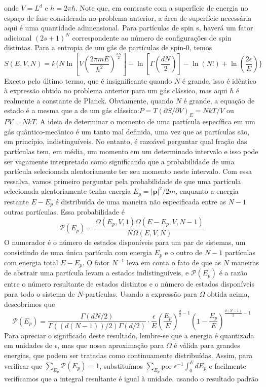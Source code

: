 \documentclass[12pt]{article}
\begin{document}
onde $V = L^d$ e $h = 2\pi\hbar$. Note que, em contraste com a superfície de energia no espaço de fase considerada no problema anterior, a área de superfície necessária aqui é uma quantidade adimensional. Para partículas de spin s, haverá um fator adicional $(2s + 1)^N$ correspondente ao número de configurações de spin distintas.
Para a entropia de um gás de partículas de spin-0, temos
\[
S(E, V, N) = k \biggl \{  N \ln \left[ V \left( \frac{2 \pi m E}{h^2} \right)^{\frac{dN}{2}} \right] - \ln \left[ \Gamma \left( \frac{dN}{2} \right) \right] - \ln(N!) + \ln \left( \frac{2 \epsilon}{E} \right)  \biggl \}
\]
Exceto pelo último termo, que é insignificante quando $N$ é grande, isso é idêntico à expressão obtida no problema anterior para um gás clássico, mas aqui $h$ é realmente a constante de Planck. Obviamente, quando $N$ é grande, a equação de estado é a mesma que a de um gás clássico:$ P = T(\partial S/\partial V)_E = NkT/V$ ou $PV = NkT$. A ideia de determinar o momento de uma partícula específica em um gás quântico-mecânico é um tanto mal definida, uma vez que as partículas são, em princípio, indistinguíveis. No entanto, é razoável perguntar qual fração das partículas tem, em média, um momento em um determinado intervalo e isso pode ser vagamente interpretado como significando que a probabilidade de uma partícula selecionada aleatoriamente ter seu momento neste intervalo. Com essa ressalva, vamos primeiro perguntar pela probabilidade de que uma partícula selecionada aleatoriamente tenha energia $E_p = |\mathbf{p}|^2/2m$, enquanto a energia restante $E - E_p$ é distribuída de uma maneira não especificada entre as $N - 1$ outras partículas. Essa probabilidade é 
 \[
 \mathcal{P}(E_p) = \frac{\Omega(E_p, V, 1) \Omega(E - E_p, V, N - 1)}{N \Omega(E, V, N)}
 \]
 O numerador é o número de estados disponíveis para um par de sistemas, um consistindo de uma única partícula com energia $E_p$ e o outro de $N - 1$ partículas com energia total $E - E_p$. O fator $N^{-1}$ leva em conta o fato de que as $N$ maneiras de abstrair uma partícula levam a estados indistinguíveis, e $\mathcal{P}(E_p)$ é a razão entre o número resultante de estados distintos e o número de estados disponíveis para todo o sistema de $N$-partículas. Usando a expressão para $\Omega$ obtida acima, descobrimos que 
 \[
 \mathcal{P}(E_p) = \frac{\Gamma(dN/2)}{\Gamma((d(N-1))/2) \Gamma(d/2)} \cdot \frac{\epsilon}{E} \left( \frac{E_p}{E} \right)^{\frac{d}{2} - 1} \left( 1 - \frac{E_p}{E} \right)^{\frac{d(N-1)}{2} - 1}
 \]
Para apreciar o significado deste resultado, lembre-se que a energia é quantizada em unidades de $\epsilon$, mas que nossa aproximação para $\Omega$ é válida para grandes energias, que podem ser tratadas como continuamente distribuídas. Assim, para verificar que $\sum_{E_p} \mathcal{P}(E_p) = 1$, substituímos $\sum_{E_p}$por $\epsilon^{-1} \int_{0}^{E} dE_p$ e facilmente verificamos que a integral resultante é igual à unidade, usando o resultado padrão 
\end{document}
